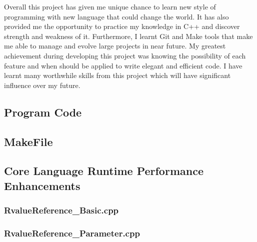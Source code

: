 \documentclass[11pt]{report}
\newcommand{\Cpp}{\lstset{language=C++,keywordstyle=\bfseries,breaklines,breakindent=30pt}}
\newcommand{\Make}{\lstset{language=make}}
\begin{document}
Overall this project has given me unique chance to learn new style of programming with new language that could change the world. It has also provided me the opportunity to practice my knowledge in C++ and discover strength and weakness of it. Furthermore, I learnt Git and Make tools that make me able to manage and evolve large projects in near future. My greatest achievement during developing this project was knowing the possibility of each feature and when should be applied to write elegant and efficient code. I have learnt many worthwhile skills from this project which will have significant influence over my future.



	


\begin{appendix}

\chapter{Program Code}
\label{chapter:Programcode}


\section{MakeFile}
\label{Makefile}

\Make

%



\section{Core Language Runtime Performance Enhancements}
\label{Appendix: corelanguage runtime performance}

\Cpp

\subsection{RvalueReference\_Basic.cpp}
\label{RvalueReference_Basic}


\subsection{RvalueReference\_Parameter.cpp}
\label{RvalueReference_Parameter}



\end{appendix}
\end{document}
